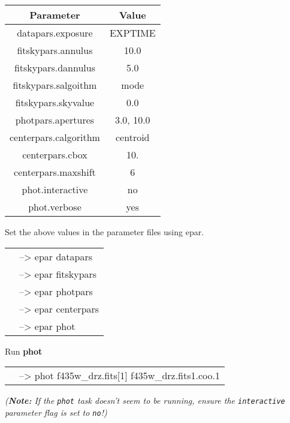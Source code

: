 \begin{minipage}{5.0in}

\begin{center}
\begin{tabular}{|c|c|}
\hline
Parameter & Value\\
\hline \hline
datapars.exposure&EXPTIME\\
\hline
fitskypars.annulus&10.0\\
\hline
fitskypars.dannulus&5.0\\
\hline
fitskypars.salgoithm&mode\\
\hline
fitskypars.skyvalue&0.0\\
\hline
photpars.apertures&3.0, 10.0\\
\hline
centerpars.calgorithm&centroid\\
\hline
centerpars.cbox& 10.\\
\hline
centerpars.maxshift&6\\
\hline
phot.interactive& no\\
\hline
phot.verbose& yes\\
\hline
\end{tabular}
\end{center}
Set the above values in the parameter files using epar. \\
\begin{tabular}{ll}
& {\color{RoyalBlue}--> epar datapars} \\
& {\color{RoyalBlue}--> epar fitskypars} \\
& {\color{RoyalBlue}--> epar photpars }\\
& {\color{RoyalBlue}--> epar centerpars } \\
& {\color{RoyalBlue}--> epar phot} \\
\end{tabular}

Run {\bf phot} \\

\begin{tabular}{ll}
& {\color{RoyalBlue}--> phot f435w\_drz.fits[1] f435w\_drz.fits1.coo.1 } \\
\end{tabular}
\end{minipage}

\emph{(\textbf{Note:} If the {\tt phot} task doesn't seem to be running, ensure the {\tt interactive} parameter flag is set to {\tt no}!)}

